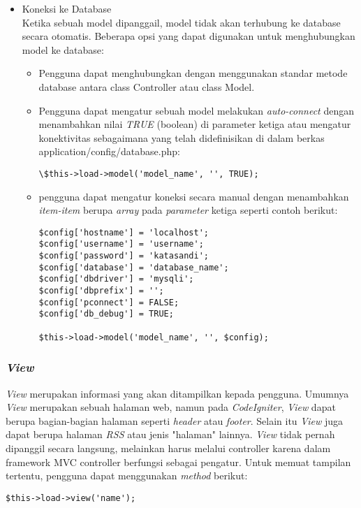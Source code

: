 \begin{itemize}
		\item Koneksi ke Database \\
		Ketika sebuah model dipanggail, model tidak akan terhubung ke database secara otomatis. Beberapa opsi yang dapat digunakan untuk menghubungkan model ke database:
		\begin{itemize}
			\item Pengguna dapat menghubungkan dengan menggunakan standar metode database antara class Controller atau class Model. \\
			\item Pengguna dapat mengatur sebuah model melakukan \textit{auto-connect} dengan menambahkan nilai \textit{TRUE} (boolean) di parameter ketiga atau mengatur konektivitas sebagaimana yang telah didefinisikan di dalam berkas application/config/database.php:
			\begin{lstlisting}[backgroundcolor = \color{lightgray}]
\$this->load->model('model_name', '', TRUE);
			\end{lstlisting}
			\item pengguna dapat mengatur koneksi secara manual dengan menambahkan \textit{item-item} berupa \textit{array} pada \textit{parameter} ketiga seperti contoh berikut:
			\begin{lstlisting}[backgroundcolor = \color{lightgray}]
$config['hostname'] = 'localhost';
$config['username'] = 'username';
$config['password'] = 'katasandi';
$config['database'] = 'database_name';
$config['dbdriver'] = 'mysqli';
$config['dbprefix'] = '';
$config['pconnect'] = FALSE;
$config['db_debug'] = TRUE;
			
$this->load->model('model_name', '', $config);
			\end{lstlisting}
		\end{itemize}
	\end{itemize}
	
	\subsubsection{\textit{View}}
	\textit{View} merupakan informasi yang akan ditampilkan kepada pengguna. Umumnya \textit{View} merupakan sebuah halaman web, namun pada \textit{CodeIgniter}, \textit{View} dapat berupa bagian-bagian halaman seperti \textit{header} atau \textit{footer}. Selain itu \textit{View} juga dapat berupa halaman \textit{RSS} atau jenis "halaman" lainnya. \textit{View} tidak pernah dipanggil secara langsung, melainkan harus melalui controller karena dalam framework MVC controller berfungsi sebagai pengatur. Untuk memuat tampilan tertentu, pengguna dapat menggunakan \textit{method} berikut:
	\begin{lstlisting}[backgroundcolor = \color{lightgray}]
$this->load->view('name');
	\end{lstlisting}
	
